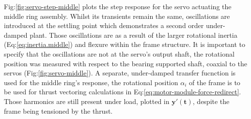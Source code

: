 \par
Fig:\ref{fig:servo-step-middle} plots the step response for the servo actuating the middle ring assembly. Whilst its transients remain the same, oscillations are introduced at the settling point which demonstrates a second order under-damped plant. Those oscillations are as a result of the larger rotational inertia (Eq:\ref{eq:inertia.middle}) and flexure within the frame structure. It is important to specify that the oscillations are not at the servo's output shaft, the rotational position was measured with respect to the bearing supported shaft, coaxial to the servos (Fig:\ref{fig:servo-middle}). A separate, under-damped transfer fucnction is used for the middle ring's response, the rotational position $\alpha_i$ of the frame is to be used for thrust vectoring calculations in Eq:\ref{eq:motor-module-force-redirect}. Those harmonics are still present under load, plotted in {\color{Red}$\mathbf{y'(t)}$}, despite the frame being tensioned by the thrust. 
